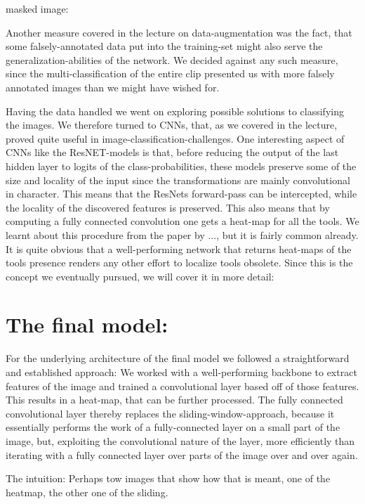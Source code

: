 masked image:

Another measure covered in the lecture on data-augmentation was the fact, that some falsely-annotated data put into the training-set might also serve the generalization-abilities of the network. We decided against any such measure, since the multi-classification of the entire clip presented us with more falsely annotated images than we might have wished for.

Having the data handled we went on exploring possible solutions to classifying the images. We therefore turned to CNNs, that, as we covered in the lecture, proved quite useful in image-classification-challenges. One interesting aspect of CNNs like the ResNET-models is that, before reducing the output of the last hidden layer to logits of the class-probabilities, these models preserve some of the size and locality of the input since the transformations are mainly convolutional in character. This means that the ResNets forward-pass can be intercepted, while the locality of the discovered features is preserved.
This also means that by computing a fully connected convolution one gets a heat-map for all the tools. We learnt about this procedure from the paper by ..., but it is fairly common already. It is quite obvious that a well-performing network that returns heat-maps of the tools presence renders any other effort to localize tools obsolete. Since this is the concept we eventually pursued, we will cover it in more detail:

\section{The final model:}
For the underlying architecture of the final model we followed a straightforward and established approach: We worked with a well-performing backbone to extract features of the image and trained a convolutional layer based off of those features. This results in a heat-map, that can be further processed.
The fully connected convolutional layer thereby replaces the sliding-window-approach, because it essentially performs the work of a fully-connected layer on a small part of the image, but, exploiting the convolutional nature of the layer, more efficiently than iterating with a fully connected layer over parts of the image over and over again. 

The intuition: Perhaps tow images that show how that is meant, one of the heatmap, the other one of the sliding.

